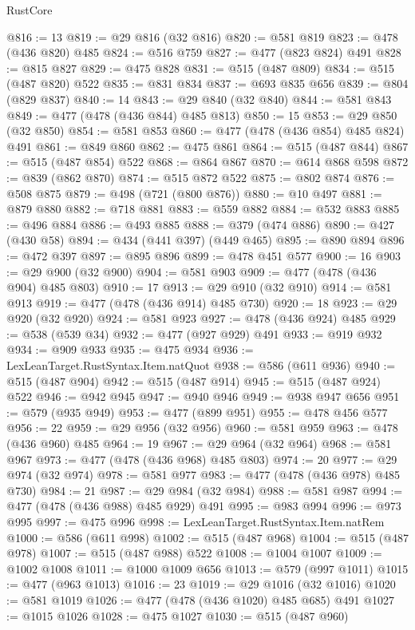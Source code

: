 \begin{lexlean}{RustCore}
\begin{coremodule}
@816 := 13
@819 := @29 @816 (@32 @816)
@820 := @581 @819
@823 := @478 (@436 @820) @485
@824 := @516 @759
@827 := @477 (@823 @824) @491
@828 := @815 @827
@829 := @475 @828
@831 := @515 (@487 @809)
@834 := @515 (@487 @820) @522
@835 := @831 @834
@837 := @693 @835 @656
@839 := @804 (@829 @837)
@840 := 14
@843 := @29 @840 (@32 @840)
@844 := @581 @843
@849 := @477 (@478 (@436 @844) @485 @813)
@850 := 15
@853 := @29 @850 (@32 @850)
@854 := @581 @853
@860 := @477 (@478 (@436 @854) @485 @824) @491
@861 := @849 @860
@862 := @475 @861
@864 := @515 (@487 @844)
@867 := @515 (@487 @854) @522
@868 := @864 @867
@870 := @614 @868 @598
@872 := @839 (@862 @870)
@874 := @515 @872 @522
@875 := @802 @874
@876 := @508 @875
@879 := @498 (@721 (@800 @876))
@880 := @10 @497
@881 := @879 @880
@882 := @718 @881
@883 := @559 @882
@884 := @532 @883
@885 := @496 @884
@886 := @493 @885
@888 := @379 (@474 @886)
@890 := @427 (@430 @58)
@894 := @434 (@441 @397) (@449 @465)
@895 := @890 @894
@896 := @472 @397
@897 := @895 @896
@899 := @478 @451 @577
@900 := 16
@903 := @29 @900 (@32 @900)
@904 := @581 @903
@909 := @477 (@478 (@436 @904) @485 @803)
@910 := 17
@913 := @29 @910 (@32 @910)
@914 := @581 @913
@919 := @477 (@478 (@436 @914) @485 @730)
@920 := 18
@923 := @29 @920 (@32 @920)
@924 := @581 @923
@927 := @478 (@436 @924) @485
@929 := @538 (@539 @34)
@932 := @477 (@927 @929) @491
@933 := @919 @932
@934 := @909 @933
@935 := @475 @934
@936 := LexLeanTarget.RustSyntax.Item.natQuot
@938 := @586 (@611 @936)
@940 := @515 (@487 @904)
@942 := @515 (@487 @914)
@945 := @515 (@487 @924) @522
@946 := @942 @945
@947 := @940 @946
@949 := @938 @947 @656
@951 := @579 (@935 @949)
@953 := @477 (@899 @951)
@955 := @478 @456 @577
@956 := 22
@959 := @29 @956 (@32 @956)
@960 := @581 @959
@963 := @478 (@436 @960) @485
@964 := 19
@967 := @29 @964 (@32 @964)
@968 := @581 @967
@973 := @477 (@478 (@436 @968) @485 @803)
@974 := 20
@977 := @29 @974 (@32 @974)
@978 := @581 @977
@983 := @477 (@478 (@436 @978) @485 @730)
@984 := 21
@987 := @29 @984 (@32 @984)
@988 := @581 @987
@994 := @477 (@478 (@436 @988) @485 @929) @491
@995 := @983 @994
@996 := @973 @995
@997 := @475 @996
@998 := LexLeanTarget.RustSyntax.Item.natRem
@1000 := @586 (@611 @998)
@1002 := @515 (@487 @968)
@1004 := @515 (@487 @978)
@1007 := @515 (@487 @988) @522
@1008 := @1004 @1007
@1009 := @1002 @1008
@1011 := @1000 @1009 @656
@1013 := @579 (@997 @1011)
@1015 := @477 (@963 @1013)
@1016 := 23
@1019 := @29 @1016 (@32 @1016)
@1020 := @581 @1019
@1026 := @477 (@478 (@436 @1020) @485 @685) @491
@1027 := @1015 @1026
@1028 := @475 @1027
@1030 := @515 (@487 @960)

\end{coremodule}
\end{lexlean}
